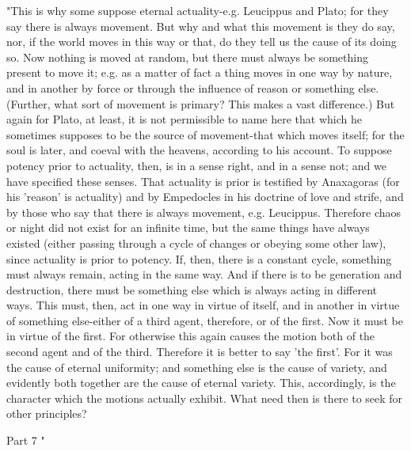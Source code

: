 "This is why some suppose eternal actuality-e.g. Leucippus and Plato;
for they say there is always movement. But why and what this movement
is they do say, nor, if the world moves in this way or that, do they
tell us the cause of its doing so. Now nothing is moved at random,
but there must always be something present to move it; e.g. as a matter
of fact a thing moves in one way by nature, and in another by force
or through the influence of reason or something else. (Further, what
sort of movement is primary? This makes a vast difference.) But again
for Plato, at least, it is not permissible to name here that which
he sometimes supposes to be the source of movement-that which moves
itself; for the soul is later, and coeval with the heavens, according
to his account. To suppose potency prior to actuality, then, is in
a sense right, and in a sense not; and we have specified these senses.
That actuality is prior is testified by Anaxagoras (for his 'reason'
is actuality) and by Empedocles in his doctrine of love and strife,
and by those who say that there is always movement, e.g. Leucippus.
Therefore chaos or night did not exist for an infinite time, but the
same things have always existed (either passing through a cycle of
changes or obeying some other law), since actuality is prior to potency.
If, then, there is a constant cycle, something must always remain,
acting in the same way. And if there is to be generation and destruction,
there must be something else which is always acting in different ways.
This must, then, act in one way in virtue of itself, and in another
in virtue of something else-either of a third agent, therefore, or
of the first. Now it must be in virtue of the first. For otherwise
this again causes the motion both of the second agent and of the third.
Therefore it is better to say 'the first'. For it was the cause of
eternal uniformity; and something else is the cause of variety, and
evidently both together are the cause of eternal variety. This, accordingly,
is the character which the motions actually exhibit. What need then
is there to seek for other principles? 

Part 7 "


